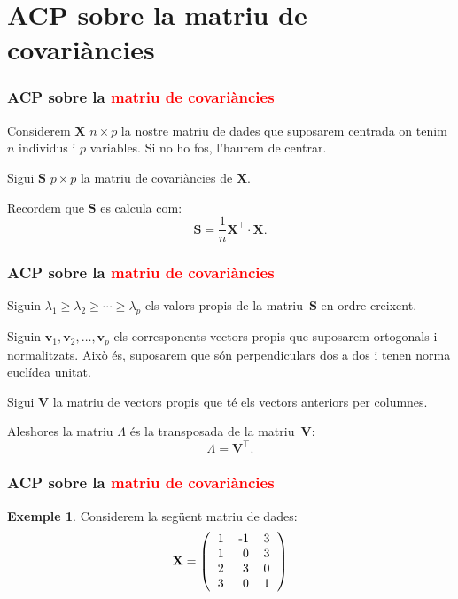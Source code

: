 \documentclass[12pt,t]{beamer}
\newcommand{\red}[1]{\textcolor{red}{#1}}
\renewcommand{\geq}{\geqslant}
\theoremstyle{plain}
\theoremstyle{definition}
\newtheorem{exemple}{Exemple}
\begin{document}
\section{ACP sobre la matriu de covariàncies}

\begin{frame}
\frametitle{ACP sobre la \red{matriu de covariàncies}}
Considerem $\mathbf{X}$ $n\times p$ la nostre matriu de dades que suposarem centrada on tenim $n$ individus i $p$ variables. Si no ho fos, l'haurem de centrar.
\bigskip

Sigui $\mathbf{S}$ $p\times p$ la matriu de covariàncies de $\mathbf{X}$.
\medskip

Recordem que $\mathbf{S}$ es calcula com:
\[
\mathbf{S}=\frac{1}{n}\mathbf{X}^\top\cdot\mathbf{X}.
\]

\end{frame}

\begin{frame}
\frametitle{ACP sobre la \red{matriu de covariàncies}}
Siguin $\lambda_1 \geq \lambda_2 \geq \cdots \geq \lambda_p$ els valors propis de la matriu~$\mathbf{S}$ en ordre creixent.
\medskip

Siguin $\mathbf{v}_1,\mathbf{v}_2,\ldots,\mathbf{v}_p$ els corresponents vectors propis que suposarem ortogonals i normalitzats. Això és, suposarem que són perpendiculars dos a dos i tenen norma euclídea unitat.
\medskip

Sigui $\mathbf{V}$ la matriu de vectors propis que té els vectors anteriors per columnes.
\medskip

Aleshores la matriu $\Lambda$ és la transposada de la matriu~$\mathbf{V}$: 
\[
\Lambda=\mathbf{V}^\top.
\]
\end{frame}

\begin{frame}[fragile]
\frametitle{ACP sobre la \red{matriu de covariàncies}}
\begin{exemple}
Considerem la següent matriu de dades:
\[
\mathbf{X}= 
\left(
\begin{tabular}{rrr}
  1 & -1 & 3 \\ 
  1 & 0 & 3 \\ 
  2 & 3 & 0 \\ 
  3 & 0 & 1 \\ 
  \end{tabular}\right)
\]

\end{exemple}
\end{frame}
\end{document}
